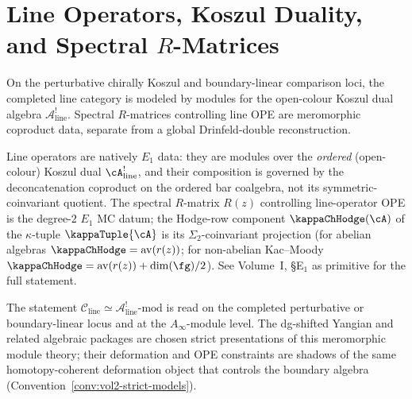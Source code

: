 \providecommand{\Har}{\operatorname{Har}}

\section{Line Operators, Koszul Duality, and Spectral $R$-Matrices}
\label{sec:line_operators}
\label{sec:line-operators}

On the perturbative chirally Koszul and boundary-linear comparison
loci, the completed line category is modeled by modules for the
open-colour Koszul dual algebra $\mathcal{A}^!_{\mathrm{line}}$.
Spectral $R$-matrices controlling line OPE are meromorphic coproduct
data, separate from a global Drinfeld-double reconstruction.

\begin{remark}
\label{rem:line-operators-e1-primacy}
Line operators are natively $E_1$ data: they are modules over the
\emph{ordered} (open-colour) Koszul dual
$\cA^!_{\mathrm{line}}$, and their composition is governed by
the deconcatenation coproduct on the ordered bar coalgebra,
not its symmetric-coinvariant quotient.
The spectral $R$-matrix $R(z)$ controlling line-operator OPE is
the degree-$2$ $E_1$ MC datum; the Hodge-row component
$\kappaChHodge(\cA)$ of the $\kappa$-tuple
$\kappaTuple{\cA}$ is its $\Sigma_2$-coinvariant projection
(for abelian algebras $\kappaChHodge = \mathrm{av}(r(z))$;
for non-abelian Kac--Moody
$\kappaChHodge = \mathrm{av}(r(z)) + \dim(\fg)/2$).
See Volume~I, \S\textup{E$_1$ as primitive}
for the full statement.
\end{remark}

\begin{remark}
\label{rem:open-sector-strict-presentation}
\providecommand{\LineOperatorsLabelTail}{tus}
\label{rem:yangian-logical-sta\LineOperatorsLabelTail}
The statement
$\mathcal{C}_{\mathrm{line}}\simeq
\mathcal{A}^!_{\mathrm{line}}\text{-mod}$ is read on
the completed perturbative or boundary-linear locus and at the
$A_\infty$-module level. The dg-shifted Yangian and related algebraic
packages are chosen strict presentations of this meromorphic module
theory; their deformation and OPE constraints are shadows of the same
homotopy-coherent deformation object that controls the boundary algebra
(Convention~\ref{conv:vol2-strict-models}).
\end{remark}

